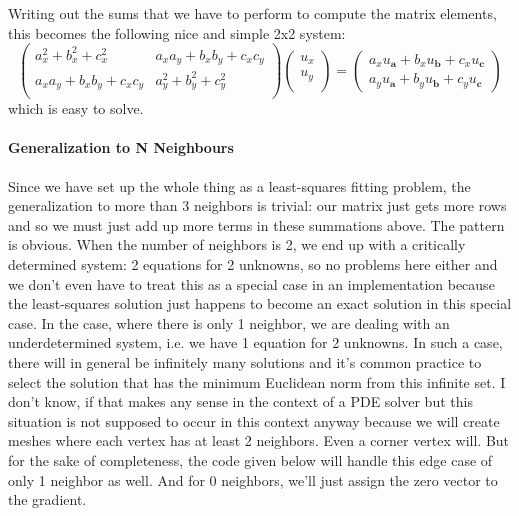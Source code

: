 Writing out the sums that we have to perform to compute the matrix elements, this becomes the following nice and simple 2x2 system:
\begin{equation}
\begin{pmatrix}
	a_x^2 + b_x^2 + c_x^2 & a_x a_y + b_x b_y + c_x c_y \\
 a_x a_y + b_x b_y + c_x c_y & a_y^2 + b_y^2 + c_y^2  \\
\end{pmatrix}
\begin{pmatrix}
u_x  \\
u_y  \\
\end{pmatrix}
= 
\begin{pmatrix}
a_x u_{\mathbf{a}} + b_x u_{\mathbf{b}} + c_x u_{\mathbf{c}} \\
a_y u_{\mathbf{a}} + b_y u_{\mathbf{b}} + c_y u_{\mathbf{c}}
\end{pmatrix}
\end{equation}
which is easy to solve.

\paragraph{Generalization to N Neighbours}
Since we have set up the whole thing as a least-squares fitting problem, the generalization to more than 3 neighbors is trivial: our matrix just gets more rows and so we must just add up more terms in these summations above. The pattern is obvious. When the number of neighbors is 2, we end up with a critically determined system: 2 equations for 2 unknowns, so no problems here either and we don't even have to treat this as a special case in an implementation because the least-squares solution just happens to become an exact solution in this special case. In the case, where there is only 1 neighbor, we are dealing with an underdetermined system, i.e. we have 1 equation for 2 unknowns. In such a case, there will in general be infinitely many solutions and it's common practice to select the solution that has the minimum Euclidean norm from this infinite set. I don't know, if that makes any sense in the context of a PDE solver but this situation is not supposed to occur in this context anyway because we will create meshes where each vertex has at least 2 neighbors. Even a corner vertex will. But for the sake of completeness, the code given below will handle this edge case of only 1 neighbor as well. And for 0 neighbors, we'll just assign the zero vector to the gradient.


